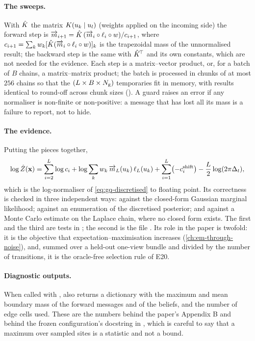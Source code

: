 \paragraph{The sweeps.}
With $\hat{K}$ the matrix $K(u_{k}\mid u_{l})$ (weights applied on the
incoming side) the forward step is
$\overrightarrow{m}_{i+1}=\hat{K}\,(\overrightarrow{m}_i\circ\ell_i\circ w)/c_{i+1}$, where
$c_{i+1}=\sum_k w_k[\hat{K}(\overrightarrow{m}_i\circ\ell_i\circ w)]_k$ is the trapezoidal mass of
the unnormalised result; the backward step is the same with $\hat{K}^{\!\top}$ and
its own constants, which are not needed for the evidence. Each step is a
matrix--vector product, or, for a batch of $B$ chains, a matrix--matrix product; the
batch is processed in chunks of at most $256$ chains so that the
$(L\times B\times N_{\mathrm{g}})$ temporaries fit in memory, with results identical to
round-off across chunk sizes (). A guard raises
an error if any normaliser is non-finite or non-positive: a message that has lost all
its mass is a failure to report, not to hide.

\paragraph{The evidence.}
Putting the pieces together,
\begin{equation}
  \log\hat Z(\mathbf{x})=\sum_{i=2}^{L}\log c_i
  +\log\sum_k w_k\,\overrightarrow{m}_L(u_{k})\,\ell_L(u_{k})
  +\sum_{i=1}^{L}\bigl(-c_i^{\mathrm{shift}}\bigr)-\frac{L}{2}\log(2\pi\Delta_t),
  \label{eq:gq-evidence}
\end{equation}
which is the log-normaliser of \cref{eq:gq-discretised} to floating point. Its
correctness is checked in three independent ways: against the closed-form Gaussian
marginal likelihood; against an enumeration of the discretised posterior; and against
a Monte Carlo estimate on the Laplace chain, where no closed form exists. The first
and the third are tests in ; the second is the file
. Its role in the paper is twofold: it is the
objective that expectation--maximisation increases (\cref{ch:em-through-noise}), and,
summed over a held-out one-view bundle and divided by the number of transitions, it
is the oracle-free selection rule of E20.

\paragraph{Diagnostic outputs.}
When called with ,  also returns a dictionary
with the maximum and mean boundary mass of the forward messages and of the beliefs,
and the number of edge cells used. These are the numbers behind the paper's Appendix B
and behind the frozen configuration's docstring in ,
which is careful to say that a maximum over sampled sites is a statistic and not a
bound.

